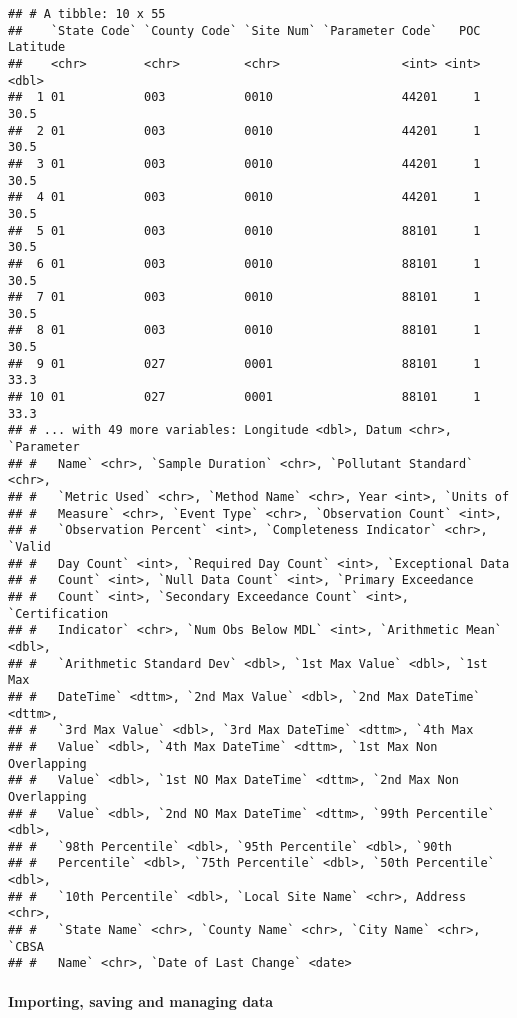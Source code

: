 \documentclass[]{article}
\let\oldparagraph\paragraph
\renewcommand{\paragraph}[1]{\oldparagraph{#1}\mbox{}}
\begin{document}
\begin{verbatim}
## # A tibble: 10 x 55
##    `State Code` `County Code` `Site Num` `Parameter Code`   POC Latitude
##    <chr>        <chr>         <chr>                 <int> <int>    <dbl>
##  1 01           003           0010                  44201     1     30.5
##  2 01           003           0010                  44201     1     30.5
##  3 01           003           0010                  44201     1     30.5
##  4 01           003           0010                  44201     1     30.5
##  5 01           003           0010                  88101     1     30.5
##  6 01           003           0010                  88101     1     30.5
##  7 01           003           0010                  88101     1     30.5
##  8 01           003           0010                  88101     1     30.5
##  9 01           027           0001                  88101     1     33.3
## 10 01           027           0001                  88101     1     33.3
## # ... with 49 more variables: Longitude <dbl>, Datum <chr>, `Parameter
## #   Name` <chr>, `Sample Duration` <chr>, `Pollutant Standard` <chr>,
## #   `Metric Used` <chr>, `Method Name` <chr>, Year <int>, `Units of
## #   Measure` <chr>, `Event Type` <chr>, `Observation Count` <int>,
## #   `Observation Percent` <int>, `Completeness Indicator` <chr>, `Valid
## #   Day Count` <int>, `Required Day Count` <int>, `Exceptional Data
## #   Count` <int>, `Null Data Count` <int>, `Primary Exceedance
## #   Count` <int>, `Secondary Exceedance Count` <int>, `Certification
## #   Indicator` <chr>, `Num Obs Below MDL` <int>, `Arithmetic Mean` <dbl>,
## #   `Arithmetic Standard Dev` <dbl>, `1st Max Value` <dbl>, `1st Max
## #   DateTime` <dttm>, `2nd Max Value` <dbl>, `2nd Max DateTime` <dttm>,
## #   `3rd Max Value` <dbl>, `3rd Max DateTime` <dttm>, `4th Max
## #   Value` <dbl>, `4th Max DateTime` <dttm>, `1st Max Non Overlapping
## #   Value` <dbl>, `1st NO Max DateTime` <dttm>, `2nd Max Non Overlapping
## #   Value` <dbl>, `2nd NO Max DateTime` <dttm>, `99th Percentile` <dbl>,
## #   `98th Percentile` <dbl>, `95th Percentile` <dbl>, `90th
## #   Percentile` <dbl>, `75th Percentile` <dbl>, `50th Percentile` <dbl>,
## #   `10th Percentile` <dbl>, `Local Site Name` <chr>, Address <chr>,
## #   `State Name` <chr>, `County Name` <chr>, `City Name` <chr>, `CBSA
## #   Name` <chr>, `Date of Last Change` <date>
\end{verbatim}

\paragraph{Importing, saving and managing
data}\label{importing-saving-and-managing-data}
\end{document}
